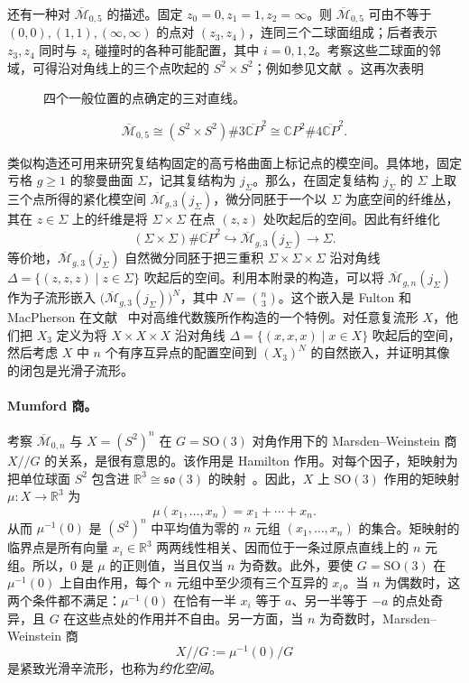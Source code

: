 还有一种对 $\overline{\mathcal M}_{0,5}$ 的描述。固定 $z_0=0,z_1=1,z_2=\infty$。则 $\overline{\mathcal M}_{0,5}$ 可由不等于 $(0,0),(1,1),(\infty,\infty)$ 的点对 $(z_3,z_4)$，连同三个二球面组成；后者表示 $z_3,z_4$ 同时与 $z_i$ 碰撞时的各种可能配置，其中 $i=0,1,2$。考察这些二球面的邻域，可得沿对角线上的三个点吹起的 $S^2\times S^2$；例如参见文献~。这再次表明
\begin{figure}[htbp]
  \centering
  
  \caption{四个一般位置的点确定的三对直线。}\label{fig:D-7-6}
\end{figure}
\[
  \overline{\mathcal M}_{0,5}
  \cong(S^2\times S^2)\#3\overline{\mathbb CP}^{2}
  \cong\mathbb CP^2\#4\overline{\mathbb CP}^{2}.
\]

类似构造还可用来研究复结构固定的高亏格曲面上标记点的模空间。具体地，固定亏格 $g\ge1$ 的黎曼曲面 $\Sigma$，记其复结构为 $j_\Sigma$。那么，在固定复结构 $j_\Sigma$ 的 $\Sigma$ 上取三个点所得的紧化模空间 $\overline{\mathcal M}_{g,3}(j_\Sigma)$，微分同胚于一个以 $\Sigma$ 为底空间的纤维丛，其在 $z\in\Sigma$ 上的纤维是将 $\Sigma\times\Sigma$ 在点 $(z,z)$ 处吹起后的空间。因此有纤维化
\[
  (\Sigma\times\Sigma)\#\overline{\mathbb CP}^{2}
  \hookrightarrow\overline{\mathcal M}_{g,3}(j_\Sigma)
  \longrightarrow\Sigma.
\]
等价地，$\overline{\mathcal M}_{g,3}(j_\Sigma)$ 自然微分同胚于把三重积 $\Sigma\times\Sigma\times\Sigma$ 沿对角线 $\Delta=\{(z,z,z)\mid z\in\Sigma\}$ 吹起后的空间。利用本附录的构造，可以将 $\overline{\mathcal M}_{g,n}(j_\Sigma)$ 作为子流形嵌入 $\bigl(\overline{\mathcal M}_{g,3}(j_\Sigma)\bigr)^N$，其中 $N=\binom n3$。这个嵌入是 Fulton 和 MacPherson 在文献~ 中对高维代数簇所作构造的一个特例。对任意复流形 $X$，他们把 $X_3$ 定义为将 $X\times X\times X$ 沿对角线 $\Delta=\{(x,x,x)\mid x\in X\}$ 吹起后的空间，然后考虑 $X$ 中 $n$ 个有序互异点的配置空间到 $(X_3)^N$ 的自然嵌入，并证明其像的闭包是光滑子流形。

\paragraph{Mumford 商。}
考察 $\overline{\mathcal M}_{0,n}$ 与 $X=(S^2)^n$ 在 $G=\mathrm{SO}(3)$ 对角作用下的 Marsden--Weinstein 商 $X/\!/G$ 的关系，是很有意思的。该作用是 Hamilton 作用。对每个因子，矩映射为把单位球面 $S^2$ 包含进 $\mathbb R^3\cong\mathfrak{so}(3)$ 的映射~。因此，$X$ 上 $\mathrm{SO}(3)$ 作用的矩映射 $\mu:X\to\mathbb R^3$ 为
\[
  \mu(x_1,\ldots,x_n)=x_1+\cdots+x_n.
\]
从而 $\mu^{-1}(0)$ 是 $(S^2)^n$ 中平均值为零的 $n$ 元组 $(x_1,\ldots,x_n)$ 的集合。矩映射的临界点是所有向量 $x_i\in\mathbb R^3$ 两两线性相关、因而位于一条过原点直线上的 $n$ 元组。所以，$0$ 是 $\mu$ 的正则值，当且仅当 $n$ 为奇数。此外，要使 $G=\mathrm{SO}(3)$ 在 $\mu^{-1}(0)$ 上自由作用，每个 $n$ 元组中至少须有三个互异的 $x_i$。当 $n$ 为偶数时，这两个条件都不满足：$\mu^{-1}(0)$ 在恰有一半 $x_i$ 等于 $a$、另一半等于 $-a$ 的点处奇异，且 $G$ 在这些点处的作用并不自由。另一方面，当 $n$ 为奇数时，Marsden--Weinstein 商
\[
  X/\!/G:=\mu^{-1}(0)/G
\]
是紧致光滑辛流形，也称为\emph{约化空间}。


